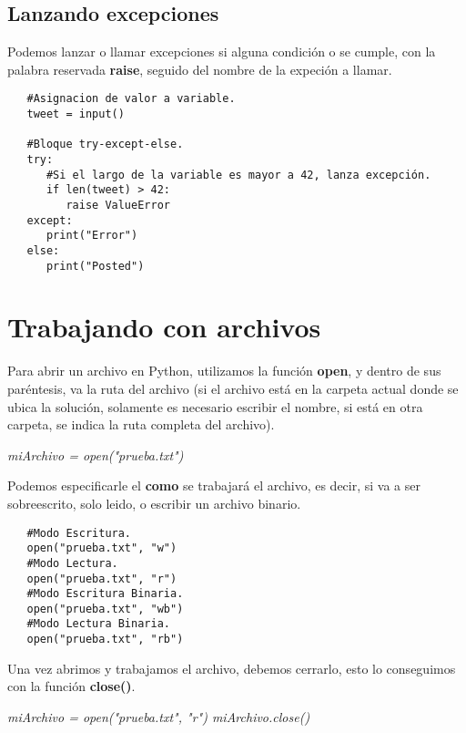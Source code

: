 \subsection{Lanzando excepciones}
\hspace{0.55cm}Podemos lanzar o llamar excepciones si alguna condición o se cumple, con la palabra reservada \textbf{raise}, seguido del nombre de la expeción a llamar.
\begin{lstlisting}
   #Asignacion de valor a variable.   
   tweet = input()

   #Bloque try-except-else.
   try:
      #Si el largo de la variable es mayor a 42, lanza excepción.
      if len(tweet) > 42:
         raise ValueError
   except:
      print("Error")
   else:
      print("Posted")
\end{lstlisting}



\section{Trabajando con archivos}
\hspace{0.55cm}Para abrir un archivo en Python, utilizamos la función \textbf{open}, y dentro de sus paréntesis, va la ruta del archivo (si el archivo está en la carpeta actual donde se ubica la solución, solamente es necesario escribir el nombre, si está en otra carpeta, se indica la ruta completa del archivo).
\begin{center}
	\textit{miArchivo = open("prueba.txt")}
\end{center}

Podemos especificarle el \textbf{como} se trabajará el archivo, es decir, si va a ser sobreescrito, solo leido, o escribir un archivo binario.
\begin{lstlisting}
   #Modo Escritura.
   open("prueba.txt", "w")
   #Modo Lectura.
   open("prueba.txt", "r")
   #Modo Escritura Binaria.
   open("prueba.txt", "wb")
   #Modo Lectura Binaria.
   open("prueba.txt", "rb")
\end{lstlisting}

Una vez abrimos y trabajamos el archivo, debemos cerrarlo, esto lo conseguimos con la función \textbf{close()}.
\begin{center}
   \textit{miArchivo = open("prueba.txt", "r")
   miArchivo.close()}
\end{center}


